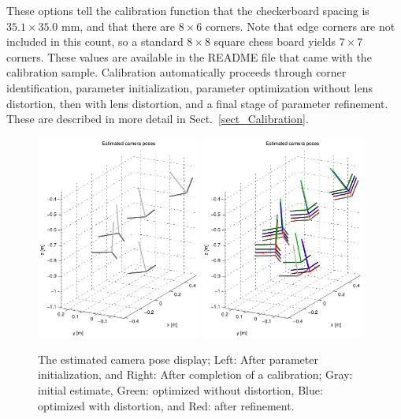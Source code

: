\documentclass[onecolumn]{article}
\begin{document}
\begin{enumerate}[leftmargin=1.5em,rightmargin=0.5cm]
These options tell the calibration function that the checkerboard spacing is $35.1 \times 35.0$ mm, and that there are $8 \times 6$ corners.  Note that edge corners are not included in this count, so a standard $8 \times 8$ square chess board yields $7 \times 7$ corners. These values are available in the README file that came with the calibration sample.  Calibration automatically proceeds through corner identification, parameter initialization, parameter optimization without lens distortion, then with lens distortion, and a final stage of parameter refinement.  These are described in more detail in Sect.~\ref{sect_Calibration}.

\begin{figure}[tbh]
	\centering
	\includegraphics[width=0.48\textwidth]{Figs/SampleCalibrationPoseEstimates_InitOnly}
	\includegraphics[width=0.48\textwidth]{Figs/SampleCalibrationPoseEstimates}
	\caption{The estimated camera pose display; Left: After parameter initialization, and Right: After completion of a calibration; Gray: initial estimate, Green: optimized without distortion, Blue: optimized with distortion, and Red: after refinement.}
	\label{fig_SampleCalibrationPoseEstimates}
\end{figure}


\end{enumerate}
\end{document}
